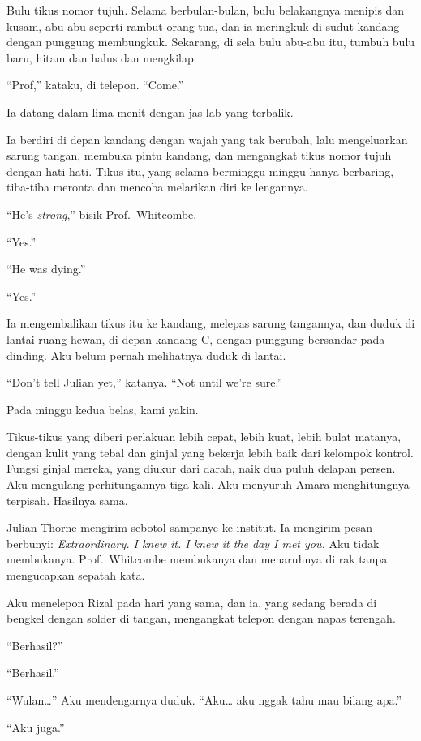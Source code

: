 \documentclass[11pt,twoside,openany]{book}
\makeatletter
\newcommand{\scenebreak}{\par\vspace{0.9em}{\centering\textsc{*\hspace{0.7em}*\hspace{0.7em}*}\par}\vspace{0.9em}\@afterindentfalse\@afterheading}
\makeatother
\begin{document}
Bulu tikus nomor tujuh. Selama berbulan-bulan, bulu belakangnya menipis dan kusam, abu-abu seperti rambut orang tua, dan ia meringkuk di sudut kandang dengan punggung membungkuk. Sekarang, di sela bulu abu-abu itu, tumbuh bulu baru, hitam dan halus dan mengkilap.

``Prof,'' kataku, di telepon. ``Come.''

Ia datang dalam lima menit dengan jas lab yang terbalik.

Ia berdiri di depan kandang dengan wajah yang tak berubah, lalu mengeluarkan sarung tangan, membuka pintu kandang, dan mengangkat tikus nomor tujuh dengan hati-hati. Tikus itu, yang selama berminggu-minggu hanya berbaring, tiba-tiba meronta dan mencoba melarikan diri ke lengannya.

``He's \emph{strong},'' bisik Prof.~Whitcombe.

``Yes.''

``He was dying.''

``Yes.''

Ia mengembalikan tikus itu ke kandang, melepas sarung tangannya, dan duduk di lantai ruang hewan, di depan kandang C, dengan punggung bersandar pada dinding. Aku belum pernah melihatnya duduk di lantai.

``Don't tell Julian yet,'' katanya. ``Not until we're sure.''

\scenebreak
Pada minggu kedua belas, kami yakin.

Tikus-tikus yang diberi perlakuan lebih cepat, lebih kuat, lebih bulat matanya, dengan kulit yang tebal dan ginjal yang bekerja lebih baik dari kelompok kontrol. Fungsi ginjal mereka, yang diukur dari darah, naik dua puluh delapan persen. Aku mengulang perhitungannya tiga kali. Aku menyuruh Amara menghitungnya terpisah. Hasilnya sama.

Julian Thorne mengirim sebotol sampanye ke institut. Ia mengirim pesan berbunyi: \emph{Extraordinary. I knew it. I knew it the day I met you.} Aku tidak membukanya. Prof.~Whitcombe membukanya dan menaruhnya di rak tanpa mengucapkan sepatah kata.

Aku menelepon Rizal pada hari yang sama, dan ia, yang sedang berada di bengkel dengan solder di tangan, mengangkat telepon dengan napas terengah.

``Berhasil?''

``Berhasil.''

``Wulan\ldots{}'' Aku mendengarnya duduk. ``Aku\ldots{} aku nggak tahu mau bilang apa.''

``Aku juga.''
\end{document}
